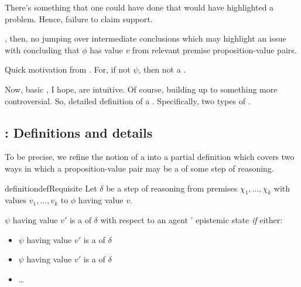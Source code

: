 
\begin{note}
  There's something that one could have done that would have highlighted a problem.
  Hence, failure to claim support.

  \ideaCS{}, then, no jumping over intermediate conclusions which may highlight an issue with concluding that \(\phi\) has value \(v\) from relevant premise proposition-value pairs.
\end{note}

\subsubparagraph{\support{}}

\begin{note}
  Quick motivation from \support{}.
  For, if not \(\psi\), then not a \sink{}.
\end{note}

\begin{note}
  Now, basic , I hope, are intuitive.
  Of course, building up to something more controversial.
  So, detailed definition of a \requ{}.
  Specifically, two types of \requ{}.
\end{note}

\subsection{: Definitions and details}
\label{sec:requ3}
\label{sec:ideaCS:requ:details}


\begin{note}
  To be precise, we refine the notion of a \requ{} into a partial definition which covers two ways in which a proposition-value pair may be a \requ{} of some step of reasoning.

  \begin{restatable}[A \requ{0}]{definition}{defRequisite}
    \label{def:requ}
    Let \(\delta\) be a step of reasoning from premises \(\chi_{1},\dots,\chi_{k}\) with values \(v_{1},\dots,v_{k}\) to \(\phi\) having value \(v\).

    \(\psi\) having value \(v'\) is a \emph{\requ{}} of \(\delta\) with respect to an agent \vAgent{}' epistemic state \emph{if} either:
    \begin{itemize}
    \item \(\psi\) having value \(v'\) is a \emph{\crequ{}} of \(\delta\)
    \item \(\psi\) having value \(v'\) is a \emph{\prequ{}} of \(\delta\)
    \item \dots
    \end{itemize}
  \end{restatable}
\end{note}

